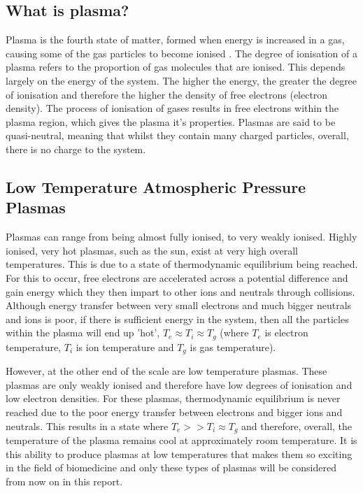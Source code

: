 \documentclass[11pt, oneside]{article}   	%
\begin{document}

\subsection{What is plasma?}
Plasma is the fourth state of matter, formed when energy is increased in a gas, causing some of the gas particles to become ionised \cite{Fridman2013PlasmaMedicine}. 
The degree of ionisation of a plasma refers to the proportion of gas molecules that are ionised.
This depends largely on the energy of the system. 
The higher the energy, the greater the degree of ionisation and therefore the higher the density of free electrons (electron density).
The process of ionisation of gases results in free electrons within the plasma region, which gives the plasma it's properties.
Plasmas are said to be quasi-neutral, meaning that whilst they contain many charged particles, overall, there is no charge to the system.

\subsection{Low Temperature Atmospheric Pressure Plasmas} \label{section:LowTempPlasmas}

Plasmas can range from being almost fully ionised, to very weakly ionised.
Highly ionised, very hot plasmas, such as the sun, exist at very high overall temperatures. 
This is due to a state of thermodynamic equilibrium being reached. 
For this to occur, free electrons are accelerated across a potential difference and gain energy which they then impart to other ions and neutrals through collisions.
Although energy transfer between very small electrons and much bigger neutrals and ions is poor, if there is sufficient energy in the system, then all the particles within the plasma will end up 'hot', $T_e \approx T_i \approx T_g$ (where $T_e$ is electron temperature, $T_i$ is ion temperature and $T_g$ is gas temperature).

However, at the other end of the scale are low temperature plasmas. 
These plasmas are only weakly ionised and therefore have low degrees of ionisation and low electron densities.
For these plasmas, thermodynamic equilibrium is never reached due to the poor energy transfer between electrons and bigger ions and neutrals. 
This results in a state where $T_e >> T_i \approx T_g$ and therefore, overall, the temperature of the plasma remains cool at approximately room temperature.
It is this ability to produce plasmas at low temperatures that makes them so exciting in the field of biomedicine and only these types of plasmas will be considered from now on in this report.
\end{document}
